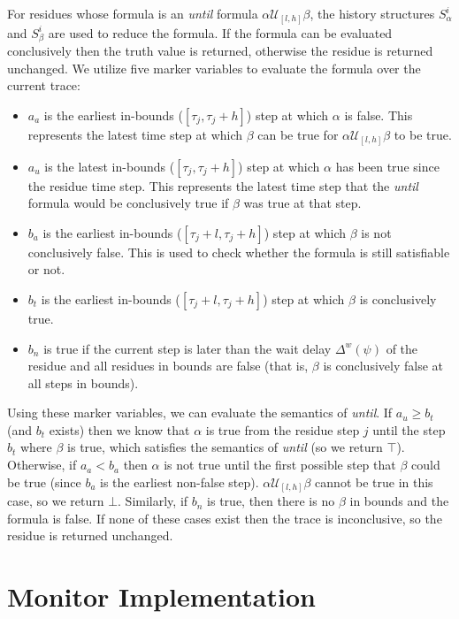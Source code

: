 \documentclass[]{llncs}
\begin{document}
For residues whose formula is an \emph{until} formula $\alpha \mathcal{U}_{[l,h]} \beta$, the history structures $S^i_\alpha$ and $S^i_\beta$ are used to reduce the formula. 
If the formula can be evaluated conclusively then the truth value is returned, otherwise the residue is returned unchanged. 
We utilize five marker variables to evaluate the formula over the current trace: 
\begin{itemize}
\item $a_a$ is the earliest in-bounds ($[\tau_j,\tau_j+h]$) step at which $\alpha$ is false. This represents the latest time step at which $\beta$ can be true for $\alpha \mathcal{U}_{[l,h]} \beta$ to be true. 
\item $a_u$ is the latest in-bounds ($[\tau_j,\tau_j+h]$) step at which $\alpha$ has been true since the residue time step.  This represents the latest time step that the \emph{until} formula would be conclusively true if $\beta$ was true at that step. 
\item $b_a$ is the earliest in-bounds ($[\tau_j+l,\tau_j+h]$) step at which $\beta$ is not conclusively false. This is used to check whether the formula is still satisfiable or not.
\item $b_t$ is the earliest in-bounds ($[\tau_j+l,\tau_j+h]$) step at which $\beta$ is conclusively true.
\item $b_n$ is true if the current step is later than the wait delay $\Delta^w(\psi)$ of the residue and all residues in bounds are false (that is, $\beta$ is conclusively false at all steps in bounds).
\end{itemize}

Using these marker variables, we can evaluate the semantics of \emph{until}. If $a_u \geq b_t$ (and $b_t$ exists) then we know that $\alpha$ is true from the residue step $j$ until the step $b_t$ where $\beta$ is true, which satisfies the semantics of \emph{until} (so we return $\top$).
%
Otherwise, if $a_a < b_a$ then $\alpha$ is not true until the first possible step that $\beta$ could be true (since $b_a$ is the earliest non-false step). $\alpha \mathcal{U}_{[l,h]} \beta$ cannot be true in this case, so we return $\bot$. Similarly, if $b_n$ is true, then there is no $\beta$ in bounds and the formula is false.
%
If none of these cases exist then the trace is inconclusive, so the residue is returned unchanged.



\section{Monitor Implementation}
\end{document}
